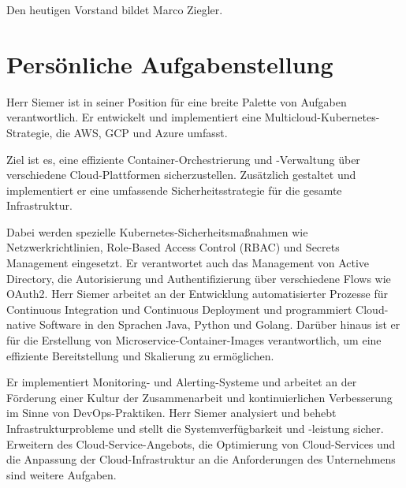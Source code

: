 Den heutigen Vorstand bildet Marco Ziegler.

\section{Persönliche Aufgabenstellung}
\label{sec:intro:persoenliche-aufgabenstellung}
Herr Siemer ist in seiner Position für eine breite Palette von Aufgaben verantwortlich.
Er entwickelt und implementiert eine Multicloud-Kubernetes-Strategie, die AWS, GCP und Azure umfasst.

Ziel ist es, eine effiziente Container-Orchestrierung und -Verwaltung über verschiedene Cloud-Plattformen sicherzustellen.
Zusätzlich gestaltet und implementiert er eine umfassende Sicherheitsstrategie für die gesamte Infrastruktur.

Dabei werden spezielle Kubernetes-Sicherheitsmaßnahmen wie Netzwerkrichtlinien, Role-Based Access Control (RBAC) und Secrets Management eingesetzt.
Er verantwortet auch das Management von Active Directory, die Autorisierung und Authentifizierung über verschiedene Flows wie OAuth2.
Herr Siemer arbeitet an der Entwicklung automatisierter Prozesse für Continuous Integration und Continuous Deployment und programmiert Cloud-native Software in den Sprachen Java, Python und Golang.
Darüber hinaus ist er für die Erstellung von Microservice-Container-Images verantwortlich, um eine effiziente Bereitstellung und Skalierung zu ermöglichen.

Er implementiert Monitoring- und Alerting-Systeme und arbeitet an der Förderung einer Kultur der Zusammenarbeit und kontinuierlichen Verbesserung im Sinne von DevOps-Praktiken.
Herr Siemer analysiert und behebt Infrastrukturprobleme und stellt die Systemverfügbarkeit und -leistung sicher.
Erweitern des Cloud-Service-Angebots, die Optimierung von Cloud-Services und die Anpassung der Cloud-Infrastruktur an die Anforderungen des Unternehmens sind weitere Aufgaben.
